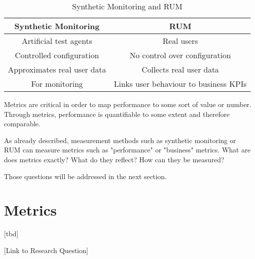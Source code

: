 \begin{table}[h!]
\begin{center}
\begin{tabular}{  c | c  }
Synthetic Monitoring & RUM \\
\hline
\hline
Artificial test agents & Real users \\
\hline
Controlled configuration & No control over configuration \\
\hline
Approximates real user data & Collects real user data \\
\hline
For monitoring & Links user behaviour to business KPIs \\
\end{tabular}
\caption{Synthetic Monitoring and RUM}
\end{center}
\end{table}



Metrics are critical in order to map performance to some sort of value or number.
Through metrics, performance is quantifiable to some extent and therefore comparable.

As already described, measurement methods such as synthetic monitoring or RUM can measure metrics such as "performance" or "business" metrics.
What are does metrics exactly?
What do they reflect?
How can they be measured?

Those questions will be addressed in the next section.









\section{Metrics}


[tbd]


[Link to Research Question] \\





